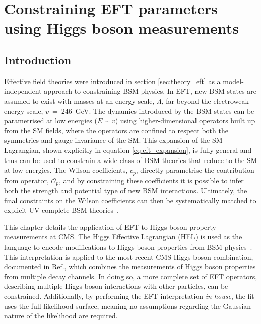 \chapter{Constraining EFT parameters using Higgs boson measurements}
\label{chap:eft}

\section{Introduction}

Effective field theories were introduced in section \ref{sec:theory_eft} as a model-independent approach to constraining BSM physics. In EFT, new BSM states are assumed to exist with masses at an energy scale, $\Lambda$, far beyond the electroweak energy scale, $v$~=~246~GeV. The dynamics introduced by the BSM states can be parametrised at low energies ($E \sim v$) using higher-dimensional operators built up from the SM fields, where the operators are confined to respect both the symmetries and gauge invariance of the SM. This expansion of the SM Lagrangian, shown explicitly in equation \ref{eq:eft_expansion}, is fully general and thus can be used to constrain a wide class of BSM theories that reduce to the SM at low energies. The Wilson coefficients, $c_p$, directly parametrise the contribution from operator, $\mathcal{O}_p$, and by constraining these coefficients it is possible to infer both the strength and potential type of new BSM interactions. Ultimately, the final constraints on the Wilson coefficients can then be systematically matched to explicit UV-complete BSM theories~\cite{}.

This chapter details the application of EFT to Higgs boson property measurements at CMS. The Higgs Effective Lagrangian (HEL) is used as the language to encode modifications to Higgs boson properties from BSM physics~\cite{Contino:2013kra,Alloul:2013naa}. This interpretation is applied to the most recent CMS Higgs boson combination, documented in Ref.\cite{CMS-PAS-HIG-19-005}, which combines the measurements of Higgs boson properties from multiple decay channels. In doing so, a more complete set of EFT operators, describing multiple Higgs boson interactions with other particles, can be constrained. Additionally, by performing the EFT interpretation \textit{in-house}, the fit uses the full likelihood surface, meaning no assumptions regarding the Gaussian nature of the likelihood are required.

